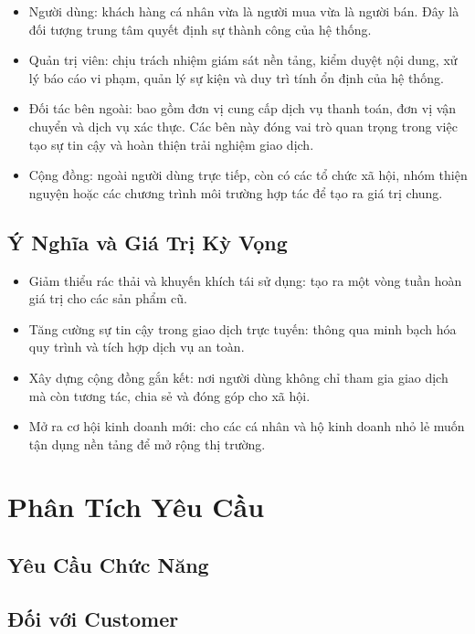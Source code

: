 \documentclass{article}
\begin{document}
\begin{itemize}
    \item Người dùng: khách hàng cá nhân vừa là người mua vừa là người bán. Đây là đối tượng trung tâm quyết định sự thành công của hệ thống.
    \item Quản trị viên: chịu trách nhiệm giám sát nền tảng, kiểm duyệt nội dung, xử lý báo cáo vi phạm, quản lý sự kiện và duy trì tính ổn định của hệ thống.
    \item Đối tác bên ngoài: bao gồm đơn vị cung cấp dịch vụ thanh toán, đơn vị vận chuyển và dịch vụ xác thực. Các bên này đóng vai trò quan trọng trong việc tạo sự tin cậy và hoàn thiện trải nghiệm giao dịch.
    \item Cộng đồng: ngoài người dùng trực tiếp, còn có các tổ chức xã hội, nhóm thiện nguyện hoặc các chương trình môi trường hợp tác để tạo ra giá trị chung.
\end{itemize}

\subsection{Ý Nghĩa và Giá Trị Kỳ Vọng}

\begin{itemize}
    \item Giảm thiểu rác thải và khuyến khích tái sử dụng: tạo ra một vòng tuần hoàn giá trị cho các sản phẩm cũ.

    \item Tăng cường sự tin cậy trong giao dịch trực tuyến: thông qua minh bạch hóa quy trình và tích hợp dịch vụ an toàn.
    \item Xây dựng cộng đồng gắn kết: nơi người dùng không chỉ tham gia giao dịch mà còn tương tác, chia sẻ và đóng góp cho xã hội.
    \item Mở ra cơ hội kinh doanh mới: cho các cá nhân và hộ kinh doanh nhỏ lẻ muốn tận dụng nền tảng để mở rộng thị trường.
\end{itemize}

\section{Phân Tích Yêu Cầu}
\subsection{Yêu Cầu Chức Năng}
\subsection*{Đối với Customer}
\end{document}
